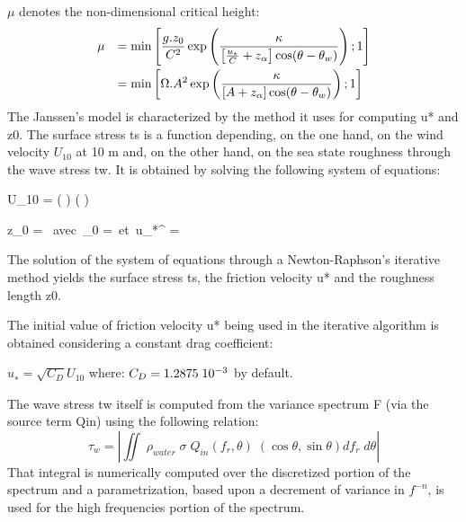  $\mu$ denotes the non-dimensional critical height:
\begin{equation} 
\label{GrindEQ__4_30_}
\barr{ll}
\mu &\dsp =\min \left[\frac{g.z_{0} }{C^{2} } \exp \left(\frac{\kappa }{\left[\frac{u_{*} }{C} +z_{\alpha } \right]\cos (\theta -\theta _{w} )} \right);1\right] \\[12pt]
&\dsp =\min \left[\Omega .A^{2} \exp \left(\frac{\kappa }{\left[A+z_{\alpha } \right]\cos (\theta -\theta _{w} )} \right);1\right]
\earr
\end{equation}
The Janssen's model \cite {Janssen1989} \cite{Janssen1991} is characterized by the method it uses for computing u* and z0. The surface stress ts is a function depending, on the one hand, on the wind velocity $U_{10}$ at 10 m and, on the other hand, on the sea state roughness through the wave stress tw. It is obtained by solving the following system of equations:

\bequ
\label{eq:defu10}
U_{10} = \ln \left( \right)\approx {} \ln \left( \right)
\eequ

\bequ
\label{eq:defz0}
z_{0} = \mbox{  avec  }_{0} =\alpha {}\mbox{  et  }u_{*}^{} =
\eequ

 The solution of the system of equations through a Newton-Raphson's iterative method yields the surface stress ts, the friction velocity u* and the roughness length z0.

The initial value of friction velocity u* being used in the iterative algorithm is obtained considering a constant drag coefficient:

$u_{*}^{} =\sqrt{C_{D} } U_{10} $ where: $C_D = 1.2875\hspace{.1cm} 10^{-3}$ by default.

 The wave stress tw itself is computed from the variance spectrum F (via the source term Qin) using the following relation:
\begin{equation} \label{GrindEQ__4_32_}
\tau _{w} =\left|\iint \;  \rho _{water} \; \sigma \; Q_{in} (f_{r} ,\theta )\; \left(\cos \theta ,\sin \theta \right)df_{r} \; d\theta \right|
\end{equation}
That integral is numerically computed over the discretized portion of the spectrum and a para\-metrization, based upon a decrement of variance in $f^{-n}$, is used for the high frequencies portion of the spectrum.

